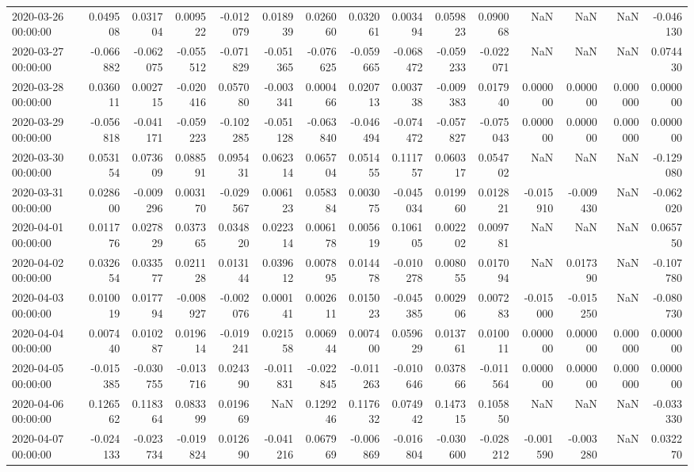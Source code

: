 \begin{tabular}{lrrrrrrrrrrrrrr}
2020-03-26 00:00:00 & 0.049508 & 0.031704 & 0.009522 & -0.012079 & 0.018939 & 0.026060 & 0.032061 & 0.003494 & 0.059823 & 0.090068 & NaN & NaN & NaN & -0.046130 \\
2020-03-27 00:00:00 & -0.066882 & -0.062075 & -0.055512 & -0.071829 & -0.051365 & -0.076625 & -0.059665 & -0.068472 & -0.059233 & -0.022071 & NaN & NaN & NaN & 0.074430 \\
2020-03-28 00:00:00 & 0.036011 & 0.002715 & -0.020416 & 0.057080 & -0.003341 & 0.000466 & 0.020713 & 0.003738 & -0.009383 & 0.017940 & 0.000000 & 0.000000 & 0.000000 & 0.000000 \\
2020-03-29 00:00:00 & -0.056818 & -0.041171 & -0.059223 & -0.102285 & -0.051128 & -0.063840 & -0.046494 & -0.074472 & -0.057827 & -0.075043 & 0.000000 & 0.000000 & 0.000000 & 0.000000 \\
2020-03-30 00:00:00 & 0.053154 & 0.073609 & 0.088591 & 0.095431 & 0.062314 & 0.065704 & 0.051455 & 0.111757 & 0.060317 & 0.054702 & NaN & NaN & NaN & -0.129080 \\
2020-03-31 00:00:00 & 0.028600 & -0.009296 & 0.003170 & -0.029567 & 0.006123 & 0.058384 & 0.003075 & -0.045034 & 0.019960 & 0.012821 & -0.015910 & -0.009430 & NaN & -0.062020 \\
2020-04-01 00:00:00 & 0.011776 & 0.027829 & 0.037365 & 0.034820 & 0.022314 & 0.006178 & 0.005619 & 0.106105 & 0.002202 & 0.009781 & NaN & NaN & NaN & 0.065750 \\
2020-04-02 00:00:00 & 0.032654 & 0.033577 & 0.021128 & 0.013144 & 0.039612 & 0.007895 & 0.014478 & -0.010278 & 0.008055 & 0.017094 & NaN & 0.017390 & NaN & -0.107780 \\
2020-04-03 00:00:00 & 0.010019 & 0.017794 & -0.008927 & -0.002076 & 0.000141 & 0.002611 & 0.015023 & -0.045385 & 0.002906 & 0.007283 & -0.015000 & -0.015250 & NaN & -0.080730 \\
2020-04-04 00:00:00 & 0.007440 & 0.010287 & 0.019614 & -0.019241 & 0.021558 & 0.006944 & 0.007400 & 0.059629 & 0.013761 & 0.010011 & 0.000000 & 0.000000 & 0.000000 & 0.000000 \\
2020-04-05 00:00:00 & -0.015385 & -0.030755 & -0.013716 & 0.024390 & -0.011831 & -0.022845 & -0.011263 & -0.010646 & 0.037866 & -0.011564 & 0.000000 & 0.000000 & 0.000000 & 0.000000 \\
2020-04-06 00:00:00 & 0.126562 & 0.118364 & 0.083399 & 0.019669 & NaN & 0.129246 & 0.117632 & 0.074942 & 0.147315 & 0.105850 & NaN & NaN & NaN & -0.033330 \\
2020-04-07 00:00:00 & -0.024133 & -0.023734 & -0.019824 & 0.012690 & -0.041216 & 0.067969 & -0.006869 & -0.016804 & -0.030600 & -0.028212 & -0.001590 & -0.003280 & NaN & 0.032270 \\

\end{tabular}
